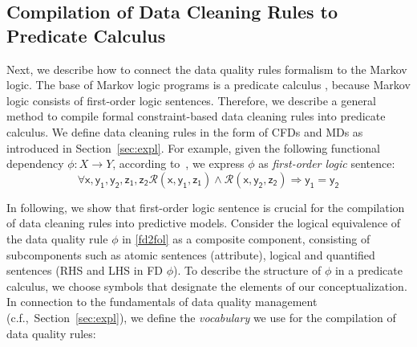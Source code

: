 \subsection{Compilation of Data Cleaning Rules to \\Predicate Calculus}
\label{sec:ml} 

Next, we describe how to connect the data quality rules formalism to the Markov logic. The base of Markov logic programs is a predicate calculus \cite{genesereth1987logical}, because Markov logic consists of first-order logic sentences. Therefore, we describe a general method to compile formal constraint-based data cleaning rules into predicate calculus. We define data cleaning rules in the form of CFDs and MDs as introduced in Section~\ref{sec:expl}. For example, given the following functional dependency $\phi: X \rightarrow Y$, according to~\cite{Fagin:1982:HCD:322344.322347}, we express $\phi$ as \textit{first-order logic} sentence:
\begin{equation}
\mathsf{\forall x, y_1, y_2, z_1, z_2 \mathcal{R}(x, y_1, z_1) \wedge \mathcal{R}(x, y_2, z_2) \Rightarrow y_1=y_2}
\label{fd2fol}
\end{equation}

In following, we show that first-order logic sentence is crucial for the compilation of data cleaning rules into predictive models. %
Consider the logical equivalence of the data quality rule $\phi$ in \ref{fd2fol} as a composite component, consisting of subcomponents such as atomic sentences (attribute), logical and quantified sentences (RHS and LHS in FD $\phi$). To describe the structure of $\phi$ in a predicate calculus, we choose symbols that designate the elements of our conceptualization. In connection to the fundamentals of data quality management (c.f.,~Section~\ref{sec:expl}), we define the \textit{vocabulary} we use for the compilation of data quality rules: 

